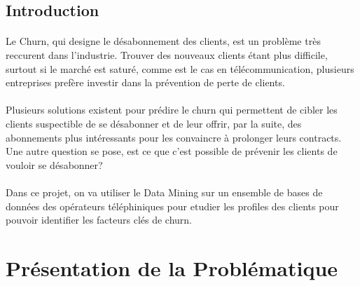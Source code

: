 \documentclass{article}
\begin{document}
  \begin{center}
\section*{\LARGE{Introduction}}
  \end{center}
\Large{\paragraph{}
        Le Churn, qui designe le désabonnement des clients, est un problème très reccurent dans l'industrie.
        Trouver des nouveaux clients étant plus difficile, surtout si le marché est saturé, comme
        est le cas en télécommunication, plusieurs entreprises prefère investir dans 
        la prévention de perte de clients.
\paragraph{}
        Plusieurs solutions existent pour prédire le churn qui
        permettent de cibler les clients suspectible de se désabonner et de leur offrir, par la suite,
        des abonnements plus intéressants pour les convaincre à prolonger leurs contracts. Une autre 
        question se pose, est ce que c'est possible de prévenir les clients de vouloir se désabonner? 
\paragraph{}        
        Dans ce projet, on va utiliser le Data Mining sur un ensemble de bases de données des 
        opérateurs téléphiniques pour etudier les profiles des clients pour pouvoir identifier les
        facteurs clés de churn.
}
\newpage

\section{Présentation de la Problématique}
\end{document}
